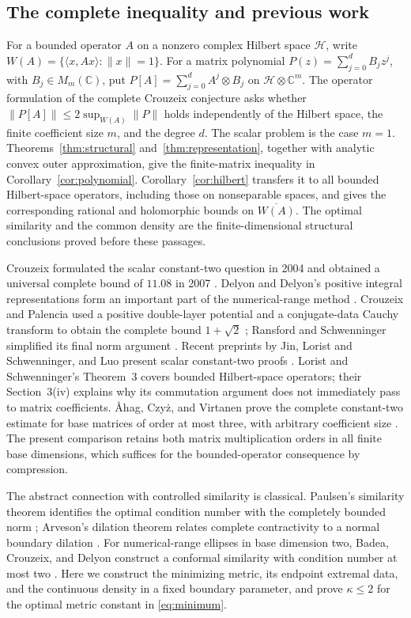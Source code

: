 \documentclass[11pt]{article}
\newcommand{\C}{\mathbb C}
\theoremstyle{definition}
\theoremstyle{remark}
\numberwithin{equation}{section}
\begin{document}
\subsection*{The complete inequality and previous work}
For a bounded operator $A$ on a nonzero complex Hilbert space $\mathcal H$,
write $W(A)=\{\langle x,Ax\rangle:\|x\|=1\}$. For a matrix polynomial
$P(z)=\sum_{j=0}^dB_jz^j$, with $B_j\in M_m(\C)$, put
$P[A]=\sum_{j=0}^dA^j\otimes B_j$ on $\mathcal H\otimes\C^m$.
The operator formulation of the complete Crouzeix conjecture asks whether
$\|P[A]\|\le2\sup_{W(A)}\|P\|$ holds independently of the Hilbert
space, the finite coefficient size $m$, and the degree $d$. The scalar
problem is the case $m=1$.
Theorems~\ref{thm:structural} and~\ref{thm:representation}, together with
analytic convex outer approximation, give the finite-matrix inequality in
Corollary~\ref{cor:polynomial}. Corollary~\ref{cor:hilbert} transfers it
to all bounded Hilbert-space operators, including those on nonseparable
spaces, and gives the corresponding rational and holomorphic bounds on
$\overline{W(A)}$. The optimal similarity and the common density are the
finite-dimensional structural conclusions proved before these passages.

Crouzeix formulated the scalar constant-two question in 2004 and obtained
a universal complete bound of $11.08$ in 2007
\cite{Crouzeix2004,Crouzeix2007}. Delyon and Delyon's positive integral
representations form an important part of the numerical-range method
\cite{DelyonDelyon1999}. Crouzeix and Palencia used a positive double-layer
potential and a conjugate-data Cauchy transform to obtain the complete
bound $1+\sqrt2$ \cite{CrouzeixPalencia2017}; Ransford and Schwenninger
simplified its final norm argument \cite{RansfordSchwenninger2018}.
Recent preprints by Jin, Lorist and Schwenninger, and Luo present
scalar constant-two proofs \cite{Jin2026,LoristSchwenninger2026,Luo2026}.
Lorist and Schwenninger's Theorem~3 covers bounded Hilbert-space operators;
their Section~3(iv) explains why its commutation argument does not
immediately pass to matrix coefficients. \AA hag, Czy{\.{z}}, and Virtanen
prove the complete constant-two estimate for base matrices of order at
most three, with arbitrary coefficient size
\cite[Theorem~1.1]{AhagCzyzVirtanen2026}. The present comparison retains
both matrix multiplication orders in all finite base dimensions, which
suffices for the bounded-operator consequence by compression.

The abstract connection with controlled similarity is classical. Paulsen's
similarity theorem identifies the optimal condition number with the completely
bounded norm \cite[Section 2, unnumbered theorem]{Paulsen1984Similarity};
Arveson's dilation theorem relates complete contractivity to a normal boundary
dilation \cite[Theorem 1.2.2]{Arveson1972}. For numerical-range ellipses in
base dimension two, Badea, Crouzeix, and Delyon construct a conformal similarity
with condition number at most two
\cite[Theorem 5.2 and Corollary 5.3]{BadeaCrouzeixDelyon2006}.
Here we construct the minimizing metric, its endpoint extremal data, and the
continuous density in a fixed boundary parameter, and prove $\kappa\le2$
for the optimal metric constant in \eqref{eq:minimum}.
\end{document}
